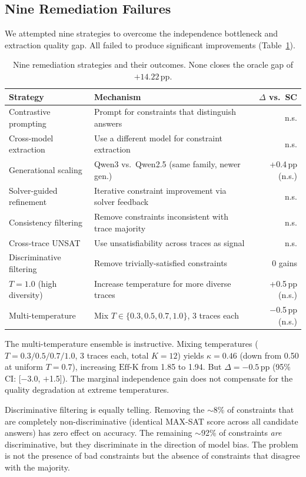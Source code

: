 \documentclass[11pt,a4paper]{article}
\newcommand{\effk}{\text{Eff-K}}
\begin{document}
\subsection{Nine Remediation Failures}
\label{sec:remediation}

We attempted nine strategies to overcome the independence bottleneck and extraction quality gap. All failed to produce significant improvements (Table~\ref{tab:remediation}).

\begin{table}[t]
\centering
\caption{Nine remediation strategies and their outcomes. None closes the oracle gap of $+14.22$\,pp.}
\label{tab:remediation}
\small
\begin{tabular}{p{3.5cm}p{7cm}r}
\toprule
\textbf{Strategy} & \textbf{Mechanism} & \textbf{$\Delta$ vs.\ SC} \\
\midrule
Contrastive prompting & Prompt for constraints that distinguish answers & n.s. \\
Cross-model extraction & Use a different model for constraint extraction & n.s. \\
Generational scaling & Qwen3 vs.\ Qwen2.5 (same family, newer gen.) & +0.4\,pp (n.s.) \\
Solver-guided refinement & Iterative constraint improvement via solver feedback & n.s. \\
Consistency filtering & Remove constraints inconsistent with trace majority & n.s. \\
Cross-trace UNSAT & Use unsatisfiability across traces as signal & n.s. \\
Discriminative filtering & Remove trivially-satisfied constraints & 0 gains \\
$T=1.0$ (high diversity) & Increase temperature for more diverse traces & +0.5\,pp (n.s.) \\
Multi-temperature & Mix $T \in \{0.3, 0.5, 0.7, 1.0\}$, 3 traces each & $-$0.5\,pp (n.s.) \\
\bottomrule
\end{tabular}
\end{table}

The multi-temperature ensemble is instructive. Mixing temperatures ($T = 0.3/0.5/0.7/1.0$, 3 traces each, total $K=12$) yields $\kappa = 0.46$ (down from 0.50 at uniform $T=0.7$), increasing $\effk$ from 1.85 to 1.94. But $\Delta = -0.5$\,pp (95\% CI: [$-$3.0, $+$1.5]). The marginal independence gain does not compensate for the quality degradation at extreme temperatures.

Discriminative filtering is equally telling. Removing the $\sim$8\% of constraints that are completely non-discriminative (identical MAX-SAT score across all candidate answers) has zero effect on accuracy. The remaining $\sim$92\% of constraints \emph{are} discriminative, but they discriminate in the direction of model bias. The problem is not the presence of bad constraints but the absence of constraints that disagree with the majority.
\end{document}
